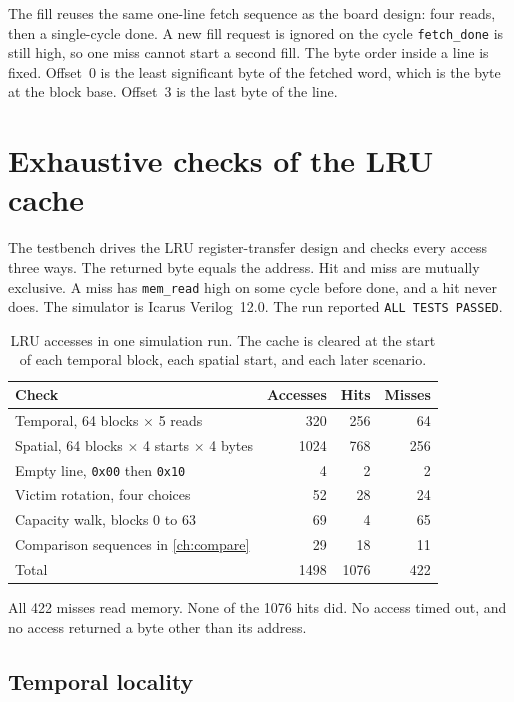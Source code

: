 \documentclass[a4paper,11pt,oneside,headings=small,parskip=half,titlepage=false]{scrreprt}
\begin{document}
The fill reuses the same one-line fetch sequence as the board design: four reads, then a single-cycle done. A new fill request is ignored on the cycle \texttt{fetch\_done} is still high, so one miss cannot start a second fill. The byte order inside a line is fixed. Offset~0 is the least significant byte of the fetched word, which is the byte at the block base. Offset~3 is the last byte of the line.

\chapter{Exhaustive checks of the LRU cache}
\label{ch:tests}

The testbench drives the LRU register-transfer design and checks every access three ways. The returned byte equals the address. Hit and miss are mutually exclusive. A miss has \texttt{mem\_read} high on some cycle before done, and a hit never does. The simulator is Icarus Verilog~12.0. The run reported \texttt{ALL TESTS PASSED}.

\begin{table}[ht]
\centering
\caption{LRU accesses in one simulation run. The cache is cleared at the start of each temporal block, each spatial start, and each later scenario.}
\label{tab:counts}
\begin{tabular}{lrrr}
\toprule
Check & Accesses & Hits & Misses \\
\midrule
Temporal, 64 blocks \(\times\) 5 reads & 320 & 256 & 64 \\
Spatial, 64 blocks \(\times\) 4 starts \(\times\) 4 bytes & 1024 & 768 & 256 \\
Empty line, \texttt{0x00} then \texttt{0x10} & 4 & 2 & 2 \\
Victim rotation, four choices & 52 & 28 & 24 \\
Capacity walk, blocks 0 to 63 & 69 & 4 & 65 \\
Comparison sequences in \cref{ch:compare} & 29 & 18 & 11 \\
\midrule
Total & 1498 & 1076 & 422 \\
\bottomrule
\end{tabular}
\end{table}

All \num{422} misses read memory. None of the \num{1076} hits did. No access timed out, and no access returned a byte other than its address.

\section{Temporal locality}
\end{document}
